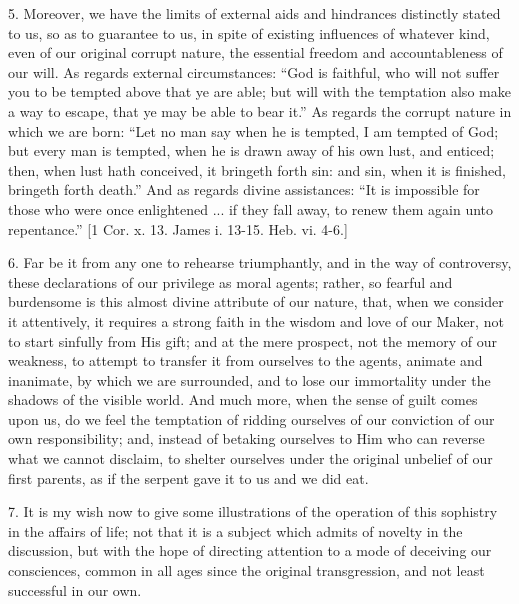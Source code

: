 5. Moreover, we have the limits of external aids and hindrances
distinctly stated to us, so as to guarantee to us, in spite of
existing influences of whatever kind, even of our original corrupt
nature, the essential freedom and accountableness of our will. As
regards external circumstances: ``God is faithful, who will not
suffer you to be tempted above that ye are able; but will with the
temptation also make a way to escape, that ye may be able to bear
it.'' As regards the corrupt nature in which we are born:
``Let no man say when he is tempted, I am tempted of God; but
every man is tempted, when he is drawn away of his own lust, and
enticed; then, when lust hath conceived, it bringeth forth sin: and
sin, when it is finished, bringeth forth death.'' And as regards
divine assistances: ``It is impossible for those who were once
enlightened ... if they fall away, to renew them again unto
repentance.'' [1 Cor. x. 13. James i. 13-15. Heb. vi. 4-6.]

6. Far be it from any one to rehearse triumphantly, and in the way
of controversy, these declarations of our privilege as moral agents;
rather, so fearful and burdensome is this almost divine attribute of
our nature, that, when we consider it attentively, it requires a
strong faith in the wisdom and love of our Maker, not to start
sinfully from His gift; and at the mere prospect, not the memory of
our weakness, to attempt to transfer it from ourselves to the agents,
animate and inanimate, by which we are surrounded, and to lose our
immortality under the shadows of the visible world. And much more,
when the sense of guilt comes upon us, do we feel the temptation of
ridding ourselves of our conviction of our own responsibility; and,
instead of betaking ourselves to Him who can reverse what we cannot
disclaim, to shelter ourselves under the original unbelief of our
first parents, as if the serpent gave it to us and we did eat.

7. It is my wish now to give some illustrations of the operation of
this sophistry in the affairs of life; not that it is a subject which
admits of novelty in the discussion, but with the hope of directing
attention to a mode of deceiving our consciences, common in all ages
since the original transgression, and not least successful in our own.

